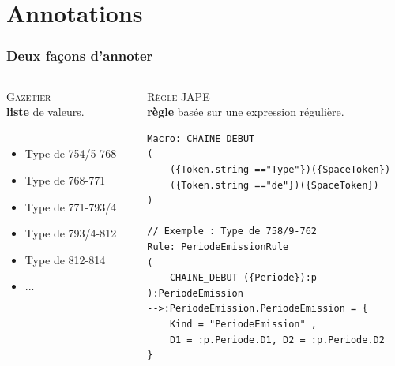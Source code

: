 \documentclass[10pt, compress]{beamer}
\begin{document}
\section{Annotations}
\begin{frame}[fragile,t]
  \frametitle{Deux façons d'annoter}
 \begin{columns}[t]
  \begin{column}{.5\linewidth}
    {\large \textsc{\alert{Gazetier}}}\\
    \textbf{liste} de valeurs.\\~\\
\begin{scriptsize}
    \begin{itemize}
    \item Type de 754/5-768
    \item Type de 768-771
    \item Type de 771-793/4
    \item Type de 793/4-812
    \item Type de 812-814
    \item ...
    \end{itemize}
\end{scriptsize}
  \end{column}
  \begin{column}{.5\linewidth}
    {\large \textsc{\alert{Règle JAPE}}}\\
    \textbf{règle} basée sur une expression régulière.\\
    \begin{lstlisting}
Macro: CHAINE_DEBUT
(
    ({Token.string =="Type"})({SpaceToken})
    ({Token.string =="de"})({SpaceToken})
)

// Exemple : Type de 758/9-762
Rule: PeriodeEmissionRule
(
    CHAINE_DEBUT ({Periode}):p
):PeriodeEmission
-->:PeriodeEmission.PeriodeEmission = {
 	Kind = "PeriodeEmission" ,
 	D1 = :p.Periode.D1, D2 = :p.Periode.D2
}
\end{lstlisting}
\end{column}
 \end{columns}  
\end{frame}
\end{document}
